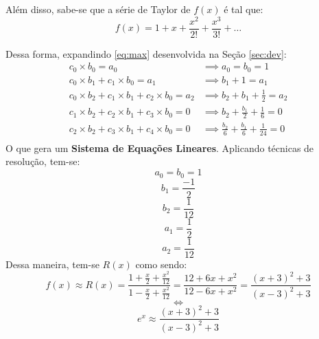 	Além disso, sabe-se que a série de Taylor de $f(x)$ é tal que:
	$$f(x) = 1 + x + \frac{x^2}{2!} + \frac{x^3}{3!} + \dots$$

	Dessa forma, expandindo \ref{eq:max} desenvolvida na Seção \ref{sec:dev}:
	\begin{align}
		c_0 \times b_0 = a_0 & \implies a_0 = b_0 = 1\\
		c_0 \times b_1 + c_1 \times b_0 = a_1 & \implies b_1 + 1 = a_1\\
		c_0 \times b_2 + c_1 \times b_1 + c_2 \times b_0 = a_2 & \implies b_2 + b_1 + \frac{1}{2} = a_2\\
		c_1 \times b_2 + c_2 \times b_1 + c_3 \times b_0 = 0 & \implies b_2 + \frac{b_1}{2} + \frac{1}{6} = 0\\
		c_2 \times b_2 + c_3 \times b_1 + c_4 \times b_0 = 0 & \implies \frac{b_2}{6} + \frac{b_1}{6} + \frac{1}{24} = 0\\
	\end{align}
	O que gera um \textbf{Sistema de Equações Lineares}. Aplicando técnicas de resolução, tem-se:
	$$a_0 = b_0 = 1$$
	$$b_1 = \frac{-1}{2}$$
	$$b_2 = \frac{1}{12}$$
	$$a_1 = \frac{1}{2}$$
	$$a_2 = \frac{1}{12}$$
	Dessa maneira, tem-se $R(x)$ como sendo:
	$$f(x) \approx R(x) = \frac{1 + \frac{x}{2} + \frac{x^2}{12}}{1 - \frac{x}{2} + \frac{x^2}{12}} = \frac{12 + 6x + x^2}{12 - 6x + x^2} = \frac{(x+3)^2 + 3}{(x-3)^2 + 3}$$
	$$\iff$$
	$$e^x \approx \frac{(x+3)^2 + 3}{(x-3)^2 + 3}$$
	
	
	\nocite{*}

